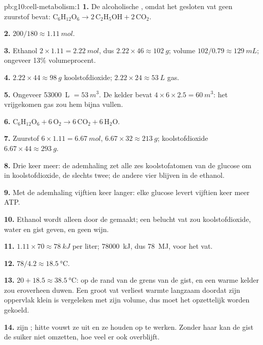 \begin{solution}{pb:g10:cell-metabolism:1}
\textbf{1.} De alcoholische , omdat het gesloten vat geen
zuurstof bevat: $\mathrm{C_6H_{12}O_6} \to 2\,\mathrm{C_2H_5OH} +
2\,\mathrm{CO_2}$.

\textbf{2.} $200/180 \approx \qty{1.11}{mol}$.

\textbf{3.} Ethanol $2 \times 1.11 = \qty{2.22}{mol}$, dus $2.22
\times 46 \approx \qty{102}{g}$; volume $102/0.79 \approx
\qty{129}{mL}$; ongeveer 13\% volumeprocent.

\textbf{4.} $2.22 \times 44 \approx \qty{98}{g}$ koolstofdioxide;
$2.22 \times 24 \approx \qty{53}{L}$ gas.

\textbf{5.} Ongeveer \qty{53000}{L} $= \qty{53}{m^3}$. De kelder bevat
$4 \times 6 \times 2.5 = \qty{60}{m^3}$: het vrijgekomen gas zou hem
bijna vullen.

\textbf{6.} $\mathrm{C_6H_{12}O_6} + 6\,\mathrm{O_2} \to
6\,\mathrm{CO_2} + 6\,\mathrm{H_2O}$.

\textbf{7.} Zuurstof $6 \times 1.11 = \qty{6.67}{mol}$, $6.67 \times 32
\approx \qty{213}{g}$; koolstofdioxide $6.67 \times 44 \approx
\qty{293}{g}$.

\textbf{8.} Drie keer meer: de ademhaling zet alle zes koolstofatomen
van de glucose om in koolstofdioxide, de  slechts twee; de andere
vier blijven in de ethanol.

\textbf{9.} Met de ademhaling vijftien keer langer: elke glucose levert
vijftien keer meer ATP.

\textbf{10.} Ethanol wordt alleen door de  gemaakt; een belucht
vat zou koolstofdioxide, water en gist geven, en geen wijn.

\textbf{11.} $1.11 \times 70 \approx \qty{78}{kJ}$ per liter;
\qty{78000}{kJ}, dus \qty{78}{MJ}, voor het vat.

\textbf{12.} $78/4.2 \approx \qty{18.5}{\celsius}$.

\textbf{13.} $20 + 18.5 \approx \qty{38.5}{\celsius}$: op de rand van de
grens van de gist, en een warme kelder zou eroverheen duwen. Een groot
vat verliest warmte langzaam doordat zijn oppervlak klein is vergeleken
met zijn volume, dus moet het opzettelijk worden gekoeld.

\textbf{14.}  zijn ; hitte vouwt ze uit en ze houden op
te werken. Zonder haar  kan de gist de suiker niet omzetten, hoe
veel er ook overblijft.


\end{solution}
